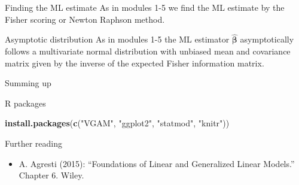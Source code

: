 \documentclass[
  ignorenonframetext,
]{beamer}
\newenvironment{Shaded}{\begin{snugshade}}{\end{snugshade}}
\newcommand{\FunctionTok}[1]{\textcolor[rgb]{0.13,0.29,0.53}{\textbf{#1}}}
\newcommand{\NormalTok}[1]{#1}
\newcommand{\StringTok}[1]{\textcolor[rgb]{0.31,0.60,0.02}{#1}}
\providecommand{\tightlist}{%
  \setlength{\itemsep}{0pt}\setlength{\parskip}{0pt}}
\begin{document}
\begin{frame}
\begin{block}{Finding the ML estimate}
\protect\hypertarget{finding-the-ml-estimate}{}
As in modules 1-5 we find the ML estimate by the Fisher scoring or
Newton Raphson method.
\end{block}

\begin{block}{Asymptotic distribution}
\protect\hypertarget{asymptotic-distribution}{}
As in modules 1-5 the ML estimator \(\hat{\boldsymbol \beta}\)
asymptotically follows a multivariate normal distribution with unbiased
mean and covariance matrix given by the inverse of the expected Fisher
information matrix.
\end{block}
\end{frame}

\begin{frame}{Summing up}
\protect\hypertarget{summing-up}{}
\end{frame}

\begin{frame}[fragile]{R packages}
\protect\hypertarget{r-packages}{}
\begin{Shaded}
\begin{Highlighting}[]
\FunctionTok{install.packages}\NormalTok{(}\FunctionTok{c}\NormalTok{(}\StringTok{"VGAM"}\NormalTok{, }\StringTok{"ggplot2"}\NormalTok{, }\StringTok{"statmod"}\NormalTok{, }\StringTok{"knitr"}\NormalTok{))}
\end{Highlighting}
\end{Shaded}
\end{frame}

\begin{frame}{Further reading}
\protect\hypertarget{further-reading}{}
\begin{itemize}
\tightlist
\item
  A. Agresti (2015): ``Foundations of Linear and Generalized Linear
  Models.'' Chapter 6. Wiley.
\end{itemize}
\end{frame}
\end{document}
